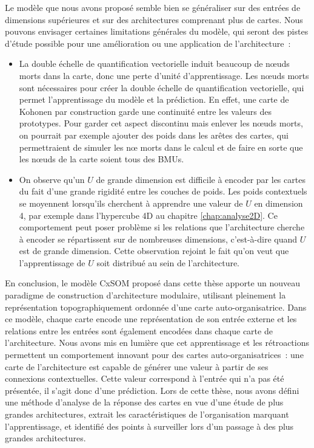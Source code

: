 Le modèle que nous avons proposé semble bien se généraliser sur des entrées de dimensions supérieures et sur des architectures comprenant plus de cartes.
Nous pouvons envisager certaines limitations générales du modèle, qui seront des pistes d'étude possible pour une amélioration ou une application de l'architecture~: 
\begin{itemize}
    \item La double échelle de quantification vectorielle induit beaucoup de n\oe{}uds morts dans la carte, donc une perte d'unité d'apprentissage. Les n\oe{}uds morts sont nécessaires pour créer la double échelle de quantification vectorielle, qui permet l'apprentissage du modèle et la prédiction. En effet, une carte de Kohonen par construction garde une continuité entre les valeurs des prototypes.
    Pour garder cet aspect discontinu mais enlever les n\oe{}uds morts, on pourrait par exemple ajouter des poids dans les arêtes des cartes, qui permettraient de simuler les n\oe{} morts dans le calcul et de faire en sorte que les n\oe{}uds de la carte soient tous des BMUs.
    \item On observe qu'un $U$ de grande dimension est difficile à encoder par les cartes du fait d'une grande rigidité entre les couches de poids. Les poids contextuels se moyennent lorsqu'ils cherchent à apprendre une valeur de $U$ en dimension 4, par exemple dans l'hypercube 4D au chapitre \ref{chap:analyse2D}. Ce comportement peut poser problème si les relations que l'architecture cherche à encoder se répartissent sur de nombreuses dimensions, c'est-à-dire quand $U$ est de grande dimension. Cette observation rejoint le fait qu'on veut que l'apprentissage de $U$ soit distribué au sein de l'architecture.
\end{itemize}

En conclusion, le modèle CxSOM proposé dans cette thèse apporte un nouveau paradigme de construction d'architecture modulaire, utilisant pleinement la représentation topographiquement ordonnée d'une carte auto-organisatrice.
Dans ce modèle, chaque carte encode une représentation de son entrée externe et les relations entre les entrées sont également encodées dans chaque carte de l'architecture. 
Nous avons mis en lumière que cet apprentissage et les rétroactions permettent un comportement innovant pour des cartes auto-organisatrices~: une carte de l'architecture est capable de générer une valeur à partir de ses connexions contextuelles. Cette valeur correspond à l'entrée qui n'a pas été présentée, il s'agit donc d'une prédiction.
Lors de cette thèse, nous avons défini une méthode d'analyse de la réponse des cartes en vue d'une étude de plus grandes architectures, extrait les caractéristiques de l'organisation marquant l'apprentissage, et identifié des points à surveiller lors d'un passage à des plus grandes architectures.

